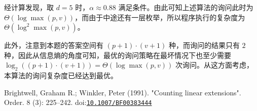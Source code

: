 \documentclass[12pt]{ctexart}
\begin{document}
经计算发现，取 $d=5$ 时，$\alpha \approx 0.88$ 满足条件。由此可知上述算法的询问此时为 $\Theta(\log \max (p, v))$，而由于中途还有一层枚举，所以程序执行的复杂度为 $\Theta(\log^2 \max(p, v))$。

此外，注意到本题的答案空间有 $(p+1)\cdot (v+1)$ 种，而询问的结果只有 $2$ 种，因此从信息熵的角度可知，最优的询问策略在最坏情况下也至少需要 $\log_2 ((p+1)\cdot (v+1)) = \Theta (\log \max (p, v))$ 次询问。从这方面考虑，本算法的询问复杂度已经达到最优。

\newpage

\begin{thebibliography}{}
 Brightwell, Graham R.; Winkler, Peter (1991). "Counting linear extensions". Order. 8 (3): 225–242. doi:\href{https://doi.org/10.1007\%2FBF00383444}{\texttt{10.1007/BF00383444}}
\end{thebibliography}
\end{document}
